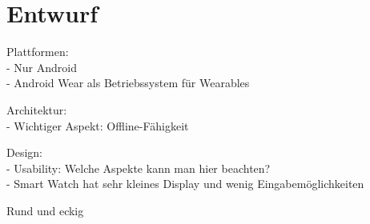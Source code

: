 \section{Entwurf}
Plattformen:
\\- Nur Android
\\- Android Wear als Betriebssystem für Wearables

Architektur:
\\- Wichtiger Aspekt: Offline-Fähigkeit

Design:
\\- Usability: Welche Aspekte kann man hier beachten?
\\- Smart Watch hat sehr kleines Display und wenig Eingabemöglichkeiten

Rund und eckig